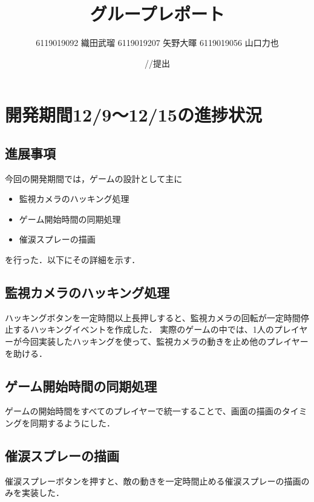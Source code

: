 \documentclass{jarticle}
\title{グループレポート}
\author{6119019092 織田武瑠 6119019207 矢野大暉 6119019056 山口力也}
\date{\number\year/\number\month/\number\day 提出}
\newcommand{\xa}{監視カメラのハッキング処理}
\newcommand{\xb}{ゲーム開始時間の同期処理}
\newcommand{\xc}{催涙スプレーの描画}
\newcommand{\pitem}[3]{
\item #1
\item #2
\item #3
}
\begin{document}
\maketitle

\section{開発期間12/9～12/15の進捗状況} 

\subsection{進展事項}
今回の開発期間では，ゲームの設計として主に
\begin{itemize}
\pitem{\xa}{\xb}{\xc}
\end{itemize}
を行った．以下にその詳細を示す．

\subsection{\xa}
ハッキングボタンを一定時間以上長押しすると、監視カメラの回転が一定時間停止するハッキングイベントを作成した．
実際のゲームの中では、1人のプレイヤーが今回実装したハッキングを使って、監視カメラの動きを止め他のプレイヤーを助ける．

\subsection{\xb}
ゲームの開始時間をすべてのプレイヤーで統一することで、画面の描画のタイミングを同期するようにした．

\subsection{\xc}
催涙スプレーボタンを押すと、敵の動きを一定時間止める催涙スプレーの描画のみを実装した．
\end{document}
